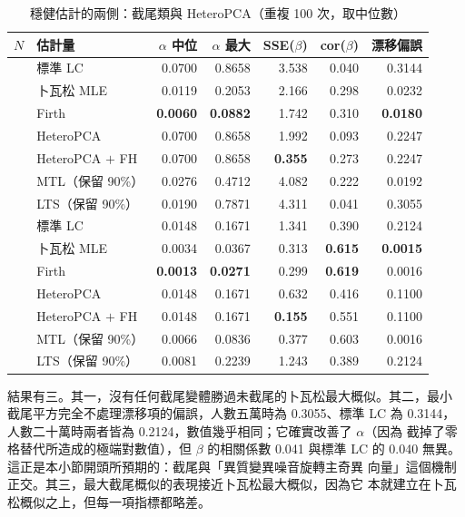 \documentclass[UTF8, fontset=macnew, a4paper, 12pt]{ctexart}
\begin{document}
\begin{table}[H]
\centering
\caption{穩健估計的兩側：截尾類與 HeteroPCA（重複 100 次，取中位數）}
\small
\begin{tabular}{llrrrrr}
\toprule
$N$ & 估計量 & $\alpha$ 中位 & $\alpha$ 最大 & SSE($\beta$) & cor($\beta$) & 漂移偏誤\\
\midrule
{}
 & 標準 LC        & 0.0700 & 0.8658 & 3.538 & 0.040 & 0.3144\\
 & 卜瓦松 MLE     & 0.0119 & 0.2053 & 2.166 & 0.298 & 0.0232\\
 & Firth          & \textbf{0.0060} & \textbf{0.0882} & 1.742 & 0.310 & \textbf{0.0180}\\
 & HeteroPCA      & 0.0700 & 0.8658 & 1.992 & 0.093 & 0.2247\\
 & HeteroPCA $+$ FH & 0.0700 & 0.8658 & \textbf{0.355} & 0.273 & 0.2247\\
 & MTL（保留 90\%） & 0.0276 & 0.4712 & 4.082 & 0.222 & 0.0192\\
 & LTS（保留 90\%） & 0.0190 & 0.7871 & 4.311 & 0.041 & 0.3055\\
\midrule
{}
 & 標準 LC        & 0.0148 & 0.1671 & 1.341 & 0.390 & 0.2124\\
 & 卜瓦松 MLE     & 0.0034 & 0.0367 & 0.313 & \textbf{0.615} & \textbf{0.0015}\\
 & Firth          & \textbf{0.0013} & \textbf{0.0271} & 0.299 & \textbf{0.619} & 0.0016\\
 & HeteroPCA      & 0.0148 & 0.1671 & 0.632 & 0.416 & 0.1100\\
 & HeteroPCA $+$ FH & 0.0148 & 0.1671 & \textbf{0.155} & 0.551 & 0.1100\\
 & MTL（保留 90\%） & 0.0066 & 0.0836 & 0.377 & 0.603 & 0.0016\\
 & LTS（保留 90\%） & 0.0081 & 0.2239 & 1.243 & 0.389 & 0.2124\\
\bottomrule
\end{tabular}
\label{tab:robust}
\end{table}

結果有三。其一，沒有任何截尾變體勝過未截尾的卜瓦松最大概似。其二，最小
截尾平方完全不處理漂移項的偏誤，人數五萬時為 0.3055、標準 LC 為 0.3144，
人數二十萬時兩者皆為 0.2124，數值幾乎相同；它確實改善了 $\alpha$（因為
截掉了零格替代所造成的極端對數值），但 $\beta$ 的相關係數 0.041 與標準 LC
的 0.040 無異。這正是本小節開頭所預期的：截尾與「異質變異噪音旋轉主奇異
向量」這個機制正交。其三，最大截尾概似的表現接近卜瓦松最大概似，因為它
本就建立在卜瓦松概似之上，但每一項指標都略差。
\end{document}
